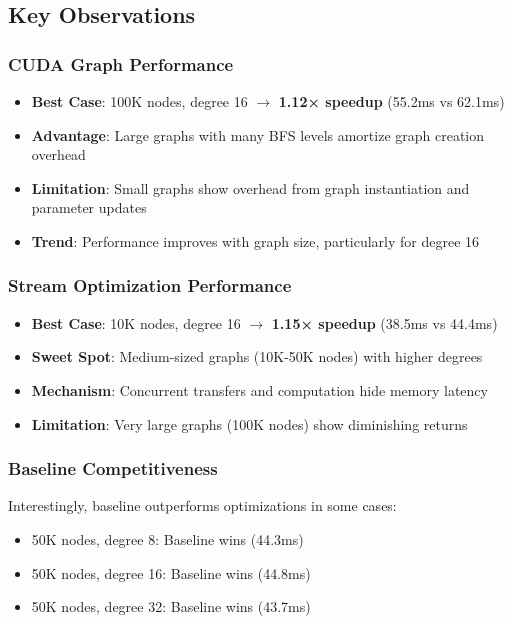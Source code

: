 \documentclass[11pt,a4paper]{article}
\begin{document}
\newpage
\subsection{Key Observations}

\subsubsection{CUDA Graph Performance}

\begin{itemize}
    \item \textbf{Best Case}: 100K nodes, degree 16 $\rightarrow$ \textbf{1.12× speedup} (55.2ms vs 62.1ms)
    \item \textbf{Advantage}: Large graphs with many BFS levels amortize graph creation overhead
    \item \textbf{Limitation}: Small graphs show overhead from graph instantiation and parameter updates
    \item \textbf{Trend}: Performance improves with graph size, particularly for degree 16
\end{itemize}

\subsubsection{Stream Optimization Performance}

\begin{itemize}
    \item \textbf{Best Case}: 10K nodes, degree 16 $\rightarrow$ \textbf{1.15× speedup} (38.5ms vs 44.4ms)
    \item \textbf{Sweet Spot}: Medium-sized graphs (10K-50K nodes) with higher degrees
    \item \textbf{Mechanism}: Concurrent transfers and computation hide memory latency
    \item \textbf{Limitation}: Very large graphs (100K nodes) show diminishing returns
\end{itemize}

\subsubsection{Baseline Competitiveness}

Interestingly, baseline outperforms optimizations in some cases:
\begin{itemize}
    \item 50K nodes, degree 8: Baseline wins (44.3ms)
    \item 50K nodes, degree 16: Baseline wins (44.8ms)
    \item 50K nodes, degree 32: Baseline wins (43.7ms)
\end{itemize}
\end{document}
